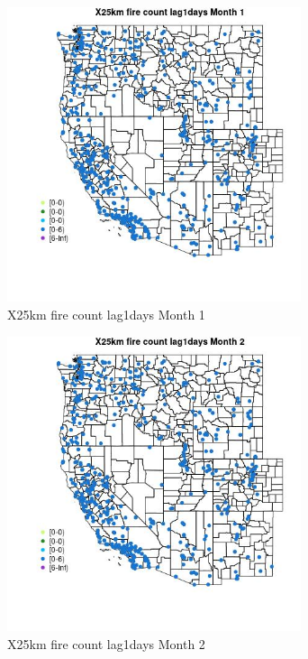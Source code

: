 \begin{figure} 
\centering  
\includegraphics[width=0.77\textwidth]{Code_Outputs/Report_ML_input_PM25_Step4_part_e_de_duplicated_aves_compiled_2019-05-14wNAs_MapObsMo1X25km_fire_count_lag1days.jpg} 
\caption{\label{fig:Report_ML_input_PM25_Step4_part_e_de_duplicated_aves_compiled_2019-05-14wNAsMapObsMo1X25km_fire_count_lag1days}X25km fire count lag1days Month 1} 
\end{figure} 
 

\begin{figure} 
\centering  
\includegraphics[width=0.77\textwidth]{Code_Outputs/Report_ML_input_PM25_Step4_part_e_de_duplicated_aves_compiled_2019-05-14wNAs_MapObsMo2X25km_fire_count_lag1days.jpg} 
\caption{\label{fig:Report_ML_input_PM25_Step4_part_e_de_duplicated_aves_compiled_2019-05-14wNAsMapObsMo2X25km_fire_count_lag1days}X25km fire count lag1days Month 2} 
\end{figure} 
 

